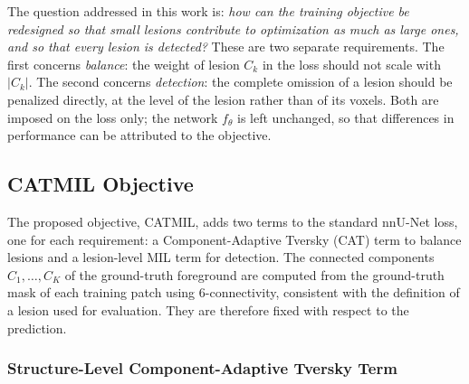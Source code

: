 The question addressed in this work is: \textit{how can the training
objective be redesigned so that small lesions contribute to optimization as
much as large ones, and so that every lesion is detected?} These are two
separate requirements. The first concerns \emph{balance}: the weight of
lesion $C_k$ in the loss should not scale with $|C_k|$. The second concerns
\emph{detection}: the complete omission of a lesion should be penalized
directly, at the level of the lesion rather than of its voxels. Both are
imposed on the loss only; the network $f_{\theta}$ is left unchanged, so
that differences in performance can be attributed to the objective.

\subsection{CATMIL Objective}

The proposed objective, CATMIL, adds two terms to the standard nnU-Net
loss, one for each requirement: a Component-Adaptive Tversky (CAT) term to
balance lesions and a lesion-level MIL term for detection. The connected
components $C_1,\ldots,C_K$ of the ground-truth foreground are computed
from the ground-truth mask of each training patch using 6-connectivity,
consistent with the definition of a lesion used for evaluation. They are
therefore fixed with respect to the prediction.

\subsubsection{Structure-Level Component-Adaptive Tversky Term}

